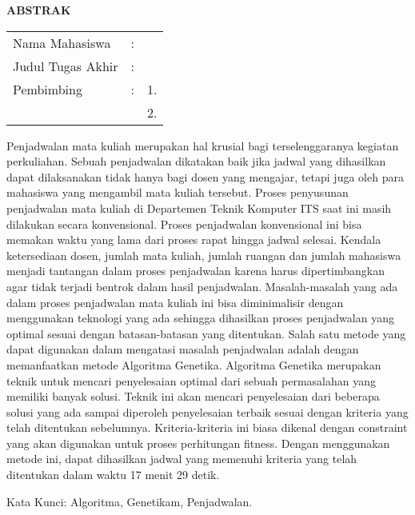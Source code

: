 \begin{center}
  \large\textbf{ABSTRAK}
  \label{chap:ABSTRAK}
\end{center}


\vspace{2ex}

\begingroup
\setlength{\tabcolsep}{0pt}

\noindent
\begin{tabularx}{\textwidth}{l >{\centering}m{2em} X}
  Nama Mahasiswa    & : & \name{}         \\

  Judul Tugas Akhir & : & \tatitle{}      \\

  Pembimbing        & : & 1. \advisor{}   \\
                    &   & 2. \coadvisor{} \\
\end{tabularx}
\endgroup

Penjadwalan mata kuliah merupakan hal krusial bagi 
terselenggaranya kegiatan perkuliahan. Sebuah penjadwalan dikatakan baik jika 
jadwal yang dihasilkan dapat dilaksanakan tidak hanya bagi dosen yang mengajar, 
tetapi juga oleh para mahasiswa yang mengambil mata kuliah tersebut. 
Proses penyusunan penjadwalan mata kuliah di Departemen Teknik Komputer ITS saat ini masih 
dilakukan secara konvensional. Proses penjadwalan konvensional ini bisa memakan waktu yang 
lama dari proses rapat hingga jadwal selesai. Kendala ketersediaan dosen, jumlah mata kuliah, 
jumlah ruangan dan jumlah mahasiswa menjadi tantangan dalam proses penjadwalan karena harus 
dipertimbangkan agar tidak terjadi bentrok dalam hasil penjadwalan. Masalah-masalah yang ada 
dalam proses penjadwalan mata kuliah ini bisa diminimalisir dengan menggunakan teknologi 
yang ada sehingga dihasilkan proses penjadwalan yang optimal sesuai dengan batasan-batasan yang ditentukan.
Salah satu metode yang dapat digunakan dalam mengatasi masalah penjadwalan adalah dengan memanfaatkan 
metode Algoritma Genetika. Algoritma Genetika merupakan teknik untuk mencari penyelesaian optimal dari 
sebuah permasalahan yang memiliki banyak solusi. Teknik ini akan mencari penyelesaian dari beberapa 
solusi yang ada sampai diperoleh penyelesaian terbaik sesuai dengan kriteria yang telah ditentukan sebelumnya. 
Kriteria-kriteria ini biasa dikenal dengan constraint yang akan digunakan untuk proses perhitungan fitness. 
Dengan menggunakan metode ini, dapat dihasilkan jadwal yang memenuhi kriteria yang telah ditentukan dalam waktu 17 menit 29 detik.

Kata Kunci: Algoritma, Genetikam, Penjadwalan.
